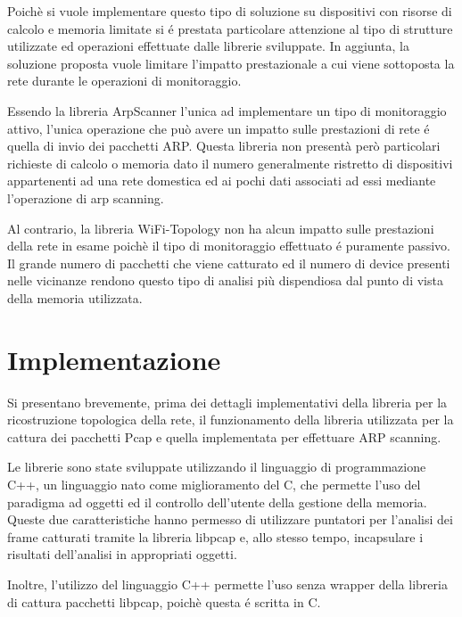 Poich\`e si vuole implementare questo tipo di soluzione su dispositivi con risorse di calcolo e memoria limitate si \'e prestata particolare attenzione al tipo di strutture utilizzate ed operazioni effettuate dalle librerie sviluppate.
In aggiunta, la soluzione proposta vuole limitare l'impatto prestazionale a cui viene sottoposta la rete durante le operazioni di monitoraggio.

Essendo la libreria ArpScanner l'unica ad implementare un tipo di monitoraggio attivo, l'unica operazione che pu\`o avere un impatto sulle prestazioni di rete \'e quella di invio dei pacchetti ARP.
Questa libreria non present\`a per\`o particolari richieste di calcolo o memoria dato il numero generalmente ristretto di dispositivi appartenenti ad una rete domestica ed ai pochi dati associati ad essi mediante l'operazione di arp scanning.

Al contrario, la libreria WiFi-Topology non ha alcun impatto sulle prestazioni della rete in esame poich\`e il tipo di monitoraggio effettuato \'e puramente passivo.
Il grande numero di pacchetti che viene catturato ed il numero di device presenti nelle vicinanze rendono questo tipo di analisi pi\`u dispendiosa dal punto di vista della memoria utilizzata.

\newpage


\section{Implementazione}
Si presentano brevemente, prima dei dettagli implementativi della libreria per la ricostruzione topologica della rete, il funzionamento della libreria utilizzata per la cattura dei pacchetti Pcap e quella implementata per effettuare ARP scanning.

Le librerie sono state sviluppate utilizzando il linguaggio di programmazione C++, un linguaggio nato come miglioramento del C, che permette l'uso del paradigma ad oggetti ed il controllo dell'utente della gestione della memoria.
Queste due caratteristiche hanno permesso di utilizzare puntatori per l'analisi dei frame catturati tramite la libreria libpcap e, allo stesso tempo, incapsulare i risultati dell'analisi in appropriati oggetti.

Inoltre, l'utilizzo del linguaggio C++ permette l'uso senza wrapper della libreria di cattura pacchetti libpcap, poich\`e questa \'e scritta in C.



